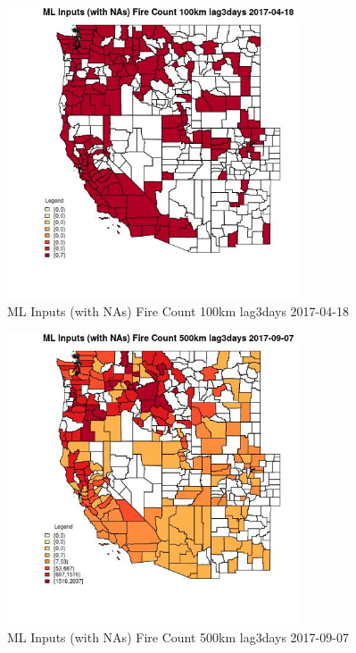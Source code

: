 \begin{figure} 
\centering  
\includegraphics[width=0.77\textwidth]{Code_Outputs/Report_ML_input_PM25_Step4_part_e_de_duplicated_aves_compiled_2019-05-21wNAs_CountyFire_Count_100km_lag3daysMean2017-04-18.jpg} 
\caption{\label{fig:Report_ML_input_PM25_Step4_part_e_de_duplicated_aves_compiled_2019-05-21wNAsCountyFire_Count_100km_lag3daysMean2017-04-18}ML Inputs (with NAs) Fire Count 100km lag3days 2017-04-18} 
\end{figure} 
 

\clearpage 

\begin{figure} 
\centering  
\includegraphics[width=0.77\textwidth]{Code_Outputs/Report_ML_input_PM25_Step4_part_e_de_duplicated_aves_compiled_2019-05-21wNAs_CountyFire_Count_500km_lag3daysMean2017-09-07.jpg} 
\caption{\label{fig:Report_ML_input_PM25_Step4_part_e_de_duplicated_aves_compiled_2019-05-21wNAsCountyFire_Count_500km_lag3daysMean2017-09-07}ML Inputs (with NAs) Fire Count 500km lag3days 2017-09-07} 
\end{figure} 
 

